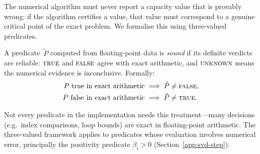%
%
%

The numerical algorithm must never report a capacity value
that is provably wrong: if the algorithm certifies a value,
that value must correspond to a genuine critical point of the
exact problem.
We formalise this using three-valued predicates.

\begin{definition}%
\label{def:sound-predicate}
A predicate~$\tilde P$ computed from floating-point data
is \emph{sound} if its definite verdicts are reliable:
$\textsc{true}$ and $\textsc{false}$ agree with exact
arithmetic, and $\textsc{unknown}$ means the numerical
evidence is inconclusive.
Formally:
\begin{align*}
  P \text{ true in exact arithmetic}
  &\;\Longrightarrow\;
  \tilde P \neq \textsc{false}, \\
  P \text{ false in exact arithmetic}
  &\;\Longrightarrow\;
  \tilde P \neq \textsc{true}.
\end{align*}
\end{definition}

Not every predicate in the implementation needs this
treatment---many decisions (e.g.\ index comparisons,
loop bounds) are exact in floating-point arithmetic.
The three-valued framework applies to predicates
whose evaluation involves numerical error, principally
the positivity predicate $\beta_i > 0$
(Section~\ref{app:svd-step}).

